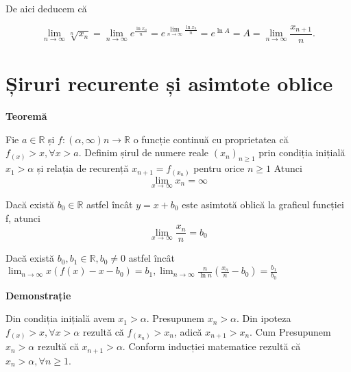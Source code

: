 \documentclass[a4paper,12pt,oneside]{report}
\begin{document}
De aici deducem că 

\begin{displaymath}
  \lim_{n \to \infty }\sqrt[n]{x_{n}} = \lim_{n \to \infty } e^{\frac{\ln x_{n}}{n}} = e^{\lim_{n \to \infty } \frac{\ln x_{n}}{n}} = e^{\ln A} = A = \lim_{n \to \infty}\frac{x_{n+1}}{n}.
\end{displaymath}

\chapter{Șiruri recurente și asimtote oblice}

\textbf{Teoremă}

 Fie \(a\in \mathbb{R}\) și \(f: \left ( \alpha ,\infty  \right )n \to \mathbb{R}\) o funcție continuă cu proprietatea că \(f_{(x)}> x, \forall x > a\). Definim șirul de numere reale \(\left ( x_{n} \right )_{n\geq 1}\) prin condiția inițială \(x_{1}> \alpha\) și relația de recurență \(x_{n+1} = f_{\left ( x_{n} \right )}\) pentru orice  \(n\geq 1	\)
Atunci 
\begin{displaymath}
  \lim_{x \to \infty }x_{n} = \infty
\end{displaymath}

Dacă există \(b_{0}\in \mathbb{R}\) astfel încât \(y = x + b_{0}\) este asimtotă oblică la graficul funcției f, atunci
\begin{displaymath}
  \lim_{x \to \infty }\frac{x_{n}}{n}=b_{0}
\end{displaymath}

Dacă există \(b_{0}, b_{1}\in \mathbb{R}, b_{0 }\neq 0\) astfel încât 
\(\lim_{n \to \infty }x\left ( f\left ( x \right )-x-b_{0} \right )= b_{1},
\lim_{n \to \infty } \frac{n}{\ln n}\left ( \frac{x_{n}}{n} -b_{0}\right )=\frac{b_{1}}{b_{0}}\)

\textbf{Demonstrație}

Din condiția inițială avem \(x_{1}> \alpha\). Presupunem \(x_{n}> \alpha\).
Din ipoteza \(f_{\left ( x \right )}> x, \forall  x> \alpha\) rezultă că \(f_{\left ( x _{n}\right )}> x_{n}\), adică \(x_{n+1}> x_{n}\). Cum Presupunem \(x_{n}> \alpha\) rezultă că \(x_{n+1}> \alpha\). Conform inducției matematice rezultă că \(x_{n}> \alpha,  \forall n\geq 1\). 
\end{document}
